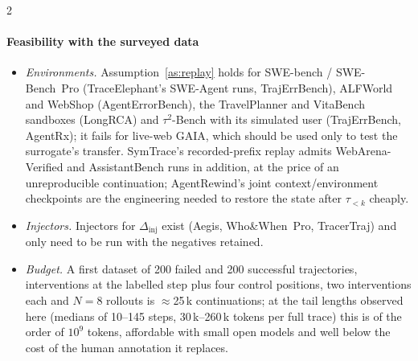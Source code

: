 \begin{multicols}{2}
\paragraph{Feasibility with the surveyed data}
\begin{itemize}[leftmargin=1.1em]
\item \emph{Environments.} Assumption~\ref{as:replay} holds for SWE-bench / SWE-Bench~Pro (TraceElephant's SWE-Agent runs, TrajErrBench), ALFWorld and WebShop (AgentErrorBench), the TravelPlanner and VitaBench sandboxes (LongRCA) and $\tau^2$-Bench with its simulated user (TrajErrBench, AgentRx); it fails for live-web GAIA, which should be used only to test the surrogate's transfer. SymTrace's recorded-prefix replay \cite{luan2026symtrace} admits WebArena-Verified and AssistantBench runs in addition, at the price of an unreproducible continuation; AgentRewind's joint context/environment checkpoints \cite{zhuang2026agentrewind} are the engineering needed to restore the state after $\tau_{<k}$ cheaply.
\item \emph{Injectors.} Injectors for $\Delta_{\mathrm{inj}}$ exist (Aegis, Who\&When~Pro, TracerTraj) and only need to be run with the negatives retained.
\item \emph{Budget.} A first dataset of 200 failed and 200 successful trajectories, interventions at the labelled step plus four control positions, two interventions each and $N=8$ rollouts is $\approx$25\,k continuations; at the tail lengths observed here (medians of 10--145 steps, 30\,k--260\,k tokens per full trace) this is of the order of $10^9$ tokens, affordable with small open models and well below the cost of the human annotation it replaces.
\end{itemize}


\end{multicols}
